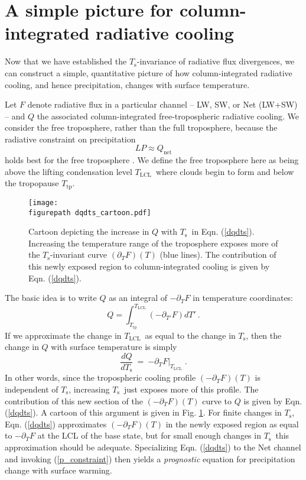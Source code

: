 \documentclass[10pt]{article}
\newcommand{\beqn}{\begin{equation}}
\newcommand{\eeqn}{\end{equation}}
\newcommand{\eqnref}[1]{(\ref{#1})}
\newcommand{\n}{\nonumber}
\newcommand{\der}[2]{\ensuremath{\frac{d #1}{d #2}}}
\newcommand{\ppt}{\ensuremath{\partial_T}}
\newcommand{\Qnet}{\ensuremath{Q_\mathrm{net}}}
\newcommand{\Ts}{\ensuremath{T_\mathrm{s}}}
\newcommand{\Tlcl}{\ensuremath{T_\mathrm{LCL}}}
\newcommand{\Ttp}{\ensuremath{T_\mathrm{tp}}}
\newcommand{\figurepath}{../figures/}
\begin{document}
		
\section{A simple picture for column-integrated radiative cooling} \label{sec_simple_Q}

Now that we have established  the \Ts-invariance of radiative flux divergences, we can construct a simple, quantitative picture of how column-integrated radiative cooling, and hence precipitation,  changes with surface temperature. 
	
	Let $F$ denote radiative flux in a particular channel -- LW, SW, or Net (LW+SW) -- and $Q$ the associated column-integrated free-tropospheric radiative cooling. We consider  the free troposphere, rather than the full troposphere, because the radiative constraint on precipitation 
		\beqn
			LP \approx \Qnet
		\label{p_constraint}
		\eeqn
		 holds best for the free troposphere  \citep{ogorman2012}. We define the free troposphere here as being above the lifting condensation level \Tlcl\ where clouds begin to form and below the tropopause \Ttp.
	
\begin{figure}[t]
	\begin{center}
			\texttt{[image: \\figurepath dqdts\_cartoon.pdf]}
		\caption{Cartoon depicting the increase in $Q$ with \Ts\ in Eqn. \eqnref{dqdts}. Increasing the temperature range of the troposphere  exposes more of the \Ts-invariant curve $(\ppt F)(T)$ (blue lines). The contribution  of this newly exposed region to column-integrated cooling is given by Eqn. \eqnref{dqdts}.
		\label{dqdts_cartoon}
		}
	\end{center}
\end{figure}


	  The basic idea is to write $Q$ as an integral of $-\ppt F$  in temperature coordinates: 
	\beqn
		Q =  \int_{\Ttp}^{\Tlcl} (-\partial_{T'} F) dT' \ . 
		\n
	\eeqn
   If we approximate the change in  \Tlcl\ as equal to the change in \Ts, then the change in $Q$ with surface temperature is  simply
	\beqn
		\der{Q}{\Ts} \ =\  \left.  -\ppt F\right|_{\Tlcl}  \; .
	\label{dqdts}
	\eeqn
In other words, since the tropospheric cooling profile $(-\ppt F)(T)$  is independent of \Ts, increasing \Ts\ just exposes more of this profile.  The contribution of this new section of the $(-\ppt F)(T)$ curve to $Q$ is given by Eqn. \eqnref{dqdts}.  A cartoon of this argument is given in Fig. \ref{dqdts_cartoon}. For finite changes in \Ts, Eqn. \eqnref{dqdts} approximates $(-\ppt F)(T)$ in the newly exposed region as equal to $-\ppt F$ at the LCL of the base state, but for small enough changes in \Ts\ this approximation should be adequate. Specializing Eqn. \eqnref{dqdts} to the Net channel and invoking \eqnref{p_constraint} then yields a \emph{prognostic} equation for precipitation change with surface warming.
\end{document}
